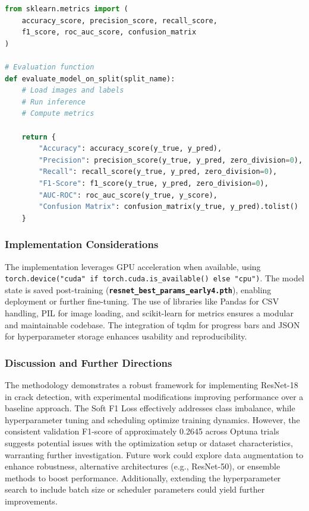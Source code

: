 \begin{lstlisting}[language=Python]
from sklearn.metrics import (
	accuracy_score, precision_score, recall_score,
	f1_score, roc_auc_score, confusion_matrix
)
	
# Evaluation function
def evaluate_model_on_split(split_name):
	# Load images and labels
	# Run inference
	# Compute metrics

	return {
		"Accuracy": accuracy_score(y_true, y_pred),
		"Precision": precision_score(y_true, y_pred, zero_division=0),
		"Recall": recall_score(y_true, y_pred, zero_division=0),
		"F1-Score": f1_score(y_true, y_pred, zero_division=0),
		"AUC-ROC": roc_auc_score(y_true, y_score),
		"Confusion Matrix": confusion_matrix(y_true, y_pred).tolist()
	}

\end{lstlisting}

\subsubsection{Implementation Considerations}

The implementation leverages GPU acceleration when available, using \texttt{torch.device("cuda" if torch.cuda.is\_available() else "cpu")}. The model state is saved post-training (\textbf{\texttt{resnet\_best\_params\_early4.pth}}), enabling deployment or further fine-tuning. The use of libraries like Pandas for CSV handling, PIL for image loading, and scikit-learn for metrics ensures a modular and maintainable codebase. The integration of tqdm for progress bars and JSON for hyperparameter storage enhances usability and reproducibility.

\subsubsection{Discussion and Further Directions}

The methodology demonstrates a robust framework for implementing ResNet-18 in crack detection, with experimental modifications improving performance over a baseline approach. The Soft F1 Loss effectively addresses class imbalance, while hyperparameter tuning and scheduling optimize training dynamics. However, the consistent validation F1-score of approximately 0.2645 across Optuna trials suggests potential issues with the optimization setup or dataset characteristics, warranting further investigation. Future work could explore data augmentation to enhance robustness, alternative architectures (e.g., ResNet-50), or ensemble methods to boost performance. Additionally, extending the hyperparameter search to include batch size or scheduler parameters could yield further improvements.

